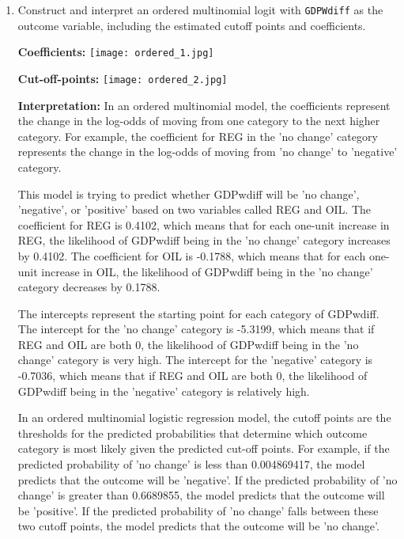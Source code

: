 \documentclass[12pt,letterpaper]{article}
\begin{document}
\begin{enumerate}
	\item Construct and interpret an ordered multinomial logit with \texttt{GDPWdiff} as the outcome variable, including the estimated cutoff points and coefficients.
\linebreak
 
\textbf{Coefficients: }
\linebreak
\texttt{[image: ordered\_1.jpg]}
\linebreak
 
\textbf{Cut-off-points:}
\linebreak
\texttt{[image: ordered\_2.jpg]}
\linebreak

\textbf{Interpretation:}
\linebreak
In an ordered multinomial model, the coefficients represent the change in the log-odds of moving from one category to the next higher category. For example, the coefficient for REG in the 'no change' category represents the change in the log-odds of moving from 'no change' to 'negative' category. 

This model is trying to predict whether GDPwdiff will be 'no change', 'negative', or 'positive' based on two variables called REG and OIL. The coefficient for REG is 0.4102, which means that for each one-unit increase in REG, the likelihood of GDPwdiff being in the 'no change' category increases by 0.4102. The coefficient for OIL is -0.1788, which means that for each one-unit increase in OIL, the likelihood of GDPwdiff being in the 'no change' category decreases by 0.1788.

The intercepts represent the starting point for each category of GDPwdiff. The intercept for the 'no change' category is -5.3199, which means that if REG and OIL are both 0, the likelihood of GDPwdiff being in the 'no change' category is very high. The intercept for the 'negative' category is -0.7036, which means that if REG and OIL are both 0, the likelihood of GDPwdiff being in the 'negative' category is relatively high.

In an ordered multinomial logistic regression model, the cutoff points are the thresholds for the predicted probabilities that determine which outcome category is most likely given the predicted cut-off points. For example, if the predicted probability of 'no change' is less than 0.004869417, the model predicts that the outcome will be 'negative'. If the predicted probability of 'no change' is greater than 0.6689855, the model predicts that the outcome will be 'positive'. If the predicted probability of 'no change' falls between these two cutoff points, the model predicts that the outcome will be 'no change'.
	
\end{enumerate}
\end{document}
